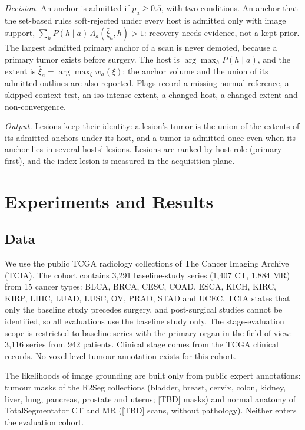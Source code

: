 \documentclass[fleqn,10pt]{olplainarticle}
\begin{document}
\emph{Decision.} An anchor is admitted if $p_a\ge0.5$, with two conditions. An anchor that the set-based rules soft-rejected
under every host is admitted only with image support, $\sum_h P(h\mid a)\,\Lambda_a(\hat\xi_a,h)>1$: recovery needs evidence, not
a kept prior. The largest admitted primary anchor of a scan is never demoted, because a primary tumor exists before surgery.
The host is $\arg\max_h P(h\mid a)$, and the extent is $\hat\xi_a=\arg\max_\xi w_a(\xi)$; the anchor volume and the union of its
admitted outlines are also reported. Flags record a missing normal reference, a skipped context test, an iso-intense extent, a
changed host, a changed extent and non-convergence.

\emph{Output.} Lesions keep their identity: a lesion's tumor is the union of the extents of its admitted anchors under its
host, and a tumor is admitted once even when its anchor lies in several hosts' lesions. Lesions are ranked by host role
(primary first), and the index lesion is measured in the acquisition plane.

\section{Experiments and Results}
\label{sec:results}

\subsection{Data}
We use the public TCGA radiology collections of The Cancer Imaging Archive (TCIA). The cohort contains 3{,}291
baseline-study series (1{,}407 CT, 1{,}884 MR) from 15 cancer types: BLCA, BRCA, CESC, COAD, ESCA, KICH, KIRC, KIRP,
LIHC, LUAD, LUSC, OV, PRAD, STAD and UCEC. TCIA states that only the baseline study precedes surgery, and post-surgical
studies cannot be identified, so all evaluations use the baseline study only. The stage-evaluation scope is restricted
to baseline series with the primary organ in the field of view: 3{,}116 series from 942 patients. Clinical stage comes
from the TCGA clinical records. No voxel-level tumour annotation exists for this cohort.

The likelihoods of image grounding are built only from public expert annotations: tumour masks of the R2Seg collections
(bladder, breast, cervix, colon, kidney, liver, lung, pancreas, prostate and uterus; [TBD] masks) and normal anatomy of
TotalSegmentator CT and MR ([TBD] scans, without pathology). Neither enters the evaluation cohort.
\end{document}
